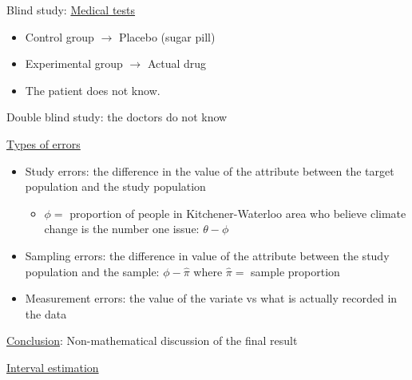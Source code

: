 Blind study: \underline{Medical tests}
\begin{itemize}
    \item Control group $ \rightarrow $ Placebo (sugar pill)
    \item Experimental group $ \rightarrow $ Actual drug
    \item The patient does not know.
\end{itemize}
Double blind study: the doctors do not know

\underline{Types of errors}
\begin{itemize}
    \item Study errors: the difference in the value of the attribute between
          the target population and the study population
          \begin{itemize}
              \item $ \phi= $ proportion of people in Kitchener-Waterloo area who
                    believe climate change is the number one issue: $ \theta-\phi $
          \end{itemize}
    \item Sampling errors: the difference in value of the attribute between the study
          population and the sample: $ \phi-\hat{\pi} $ where $ \hat{\pi}= $
          sample proportion
    \item Measurement errors: the value of the variate vs what is actually recorded
          in the data
\end{itemize}
\underline{Conclusion}: Non-mathematical discussion of the final result

\underline{Interval estimation}

